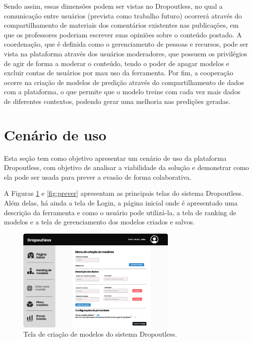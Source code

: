 \documentclass[12pt]{article}
\begin{document}
Sendo assim, essas dimensões podem ser vistas no Dropoutless, no qual a comunicação entre usuários (prevista como trabalho futuro) ocorrerá através do compartilhamento de materiais  dos comentários existentes nas publicações, em que os professores poderiam escrever suas opiniões sobre o conteúdo postado. A coordenação, que é definida como o gerenciamento de pessoas e recursos, pode ser vista na plataforma através dos usuários moderadores, que possuem os privilégios de agir de forma a moderar o conteúdo, tendo o poder de apagar modelos e excluir contas de usuários por mau uso da ferramenta. Por fim, a cooperação ocorre na criação de modelos de predição através do compartilhamento de dados com a plataforma, o que permite que o modelo treine com cada vez mais dados de diferentes contextos, podendo gerar uma melhoria nas predições geradas.

\section{Cenário de uso}
\label{sec:Cenário de uso}
Esta seção tem como objetivo apresentar um cenário de uso da plataforma Dropoutless, com objetivo de analisar a viabilidade da solução e demonstrar como ela pode ser usada para prever a evasão de forma colaborativa.

A Figuras \ref{fig:criarmodelo} e \ref{fig:prever} apresentam as principais telas do sistema Dropoutless. Além delas, há ainda a tela de Login, a página inicial onde é apresentado uma descrição da ferramenta e como o usuário pode utilizá-la, a tela de ranking de modelos e a tela de gerenciamento dos modelos criados e salvos. 

\begin{figure}
\centering
\includegraphics[width=0.7\textwidth]{images/criar modelo.png}
\caption{Tela de criação de modelos do sistema Dropoutless.}
\label{fig:criarmodelo}
\end{figure}
\end{document}
